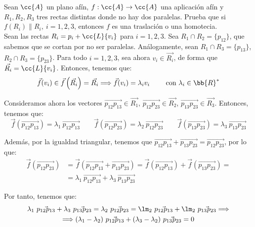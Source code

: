 \begin{ejercicio}
    Sean $\cc{A}$ un plano afín, $f : \cc{A} \to \cc{A}$ una aplicación afín y ${R}_1, {R}_2, {R}_3$ tres rectas distintas donde no hay dos paralelas. Prueba que si $f(R_i) \| R_i,~i = 1, 2, 3$, entonces $f$ es una traslación o una homotecia.\\

    Sean las rectas $R_i=p_i+\cc{L}\{v_i\}$ para $i=1,2,3$.
    Sea $R_1\cap R_2 = \{p_{12}\}$, que sabemos que se cortan por no ser paralelas. Análogamente, sean $R_1\cap R_3 = \{p_{13}\}$, $R_2\cap R_3 = \{p_{23}\}$.
    Para todo $i=1,2,3$, sea ahora $v_i\in \vec{R_i}$, de forma que $\vec{R_i}=\cc{L}\{v_i\}$.
    Entonces, tenemos que:
    \begin{equation*}
        \vec{f}(v_i) \in {\vec{f}\left(\vec{R_i}\right)} = \vec{R_i} \Longrightarrow \vec{f}(v_i) = \lambda_i v_i
        \qquad\text{ con } \lambda_i\in \bb{R}^\ast
    \end{equation*}

    Consideramos ahora los vectores $\vec{p_{12}p_{13}}\in \vec{R_1}$, $\vec{p_{12}p_{23}}\in \vec{R_2}$,
    $\vec{p_{13}p_{23}}\in \vec{R_3}$. Entonces, tenemos que:
    \begin{equation*}
        \vec{f}(\vec{p_{12}p_{13}}) = \lambda_1~ \vec{p_{12}p_{13}} \qquad
        \vec{f}(\vec{p_{12}p_{23}}) = \lambda_2~ \vec{p_{12}p_{23}} \qquad
        \vec{f}(\vec{p_{13}p_{23}}) = \lambda_3~ \vec{p_{13}p_{23}}
    \end{equation*}

    Además, por la igualdad triangular, tenemos que $\vec{p_{12}p_{13}}+\vec{p_{13}p_{23}}=\vec{p_{12}p_{23}}$, por lo que:
    \begin{equation*}
        \begin{split}
            \vec{f}(\vec{p_{12}p_{23}}) &= \vec{f}(\vec{p_{12}p_{13}}+\vec{p_{13}p_{23}}) = \vec{f}(\vec{p_{12}p_{13}})+\vec{f}(\vec{p_{13}p_{23}}) =\\
            &= \lambda_1~ \vec{p_{12}p_{13}} + \lambda_3~ \vec{p_{13}p_{23}}
        \end{split}
    \end{equation*}

    Por tanto, tenemos que:
    \begin{multline*}
        \lambda_1~ \vec{p_{12}p_{13}} + \lambda_3~ \vec{p_{13}p_{23}} =
        \lambda_2~ \vec{p_{12}p_{23}} = \lm_2~\vec{p_{12}p_{13}} + \lm_2~\vec{p_{13}p_{23}}
        \Longrightarrow \\ \Longrightarrow (\lambda_1-\lambda_2)~ \vec{p_{12}p_{13}} + (\lambda_3-\lambda_2)~ \vec{p_{13}p_{23}} = 0
    \end{multline*}


\end{ejercicio}
